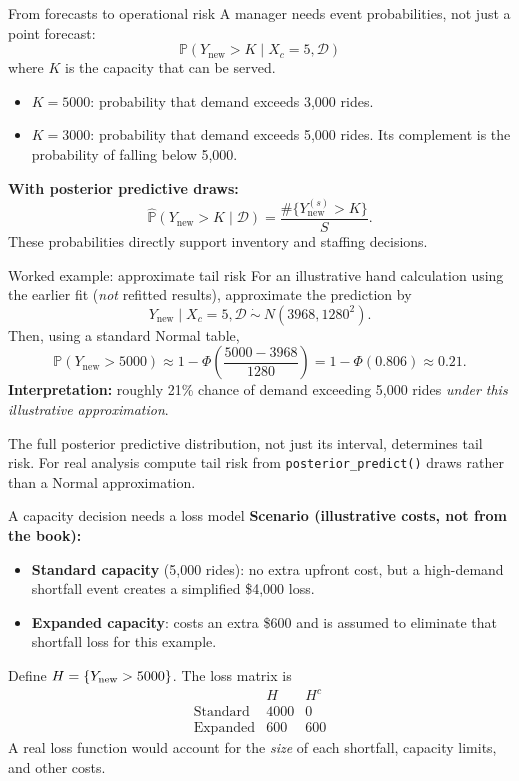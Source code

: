 \documentclass[aspectratio=43,11pt]{beamer}
\newcommand{\Prob}{\mathbb{P}}
\newcommand{\dd}{\mathcal D}
\begin{document}
\begin{frame}{From forecasts to operational risk}
A manager needs event probabilities, not just a point forecast:
\[\Prob(Y_{\mathrm{new}}>K\mid X_c=5,\dd)\]
where $K$ is the capacity that can be served.

\begin{itemize}
\item $K=5000$: probability that demand exceeds 3,000 rides.
\item $K=3000$: probability that demand exceeds 5,000 rides. Its complement is the probability of falling below 5,000.
\end{itemize}
\par\medskip
\textbf{With posterior predictive draws:}
\[\widehat{\Prob}(Y_{\mathrm{new}}>K\mid\dd)=\frac{\#\{Y_{\mathrm{new}}^{(s)}>K\}}{S}.\]
These probabilities directly support inventory and staffing decisions.
\end{frame}

\begin{frame}{Worked example: approximate tail risk}
For an illustrative hand calculation using the earlier fit (\emph{not} refitted results), approximate the prediction by
\[Y_{\mathrm{new}}\mid X_c=5,\dd\ \dot\sim\ N(3968,1280^2).\]
Then, using a standard Normal table,
\[\Prob(Y_{\mathrm{new}}>5000)\approx 1-\Phi\!\left(\frac{5000-3968}{1280}\right)
=1-\Phi(0.806)\approx0.21.\]
\textbf{Interpretation:} roughly 21\% chance of demand exceeding 5,000 rides \emph{under this illustrative approximation}.
\par\medskip
\scriptsize The full posterior predictive distribution, not just its interval, determines tail risk. For real analysis compute tail risk from \texttt{posterior\_predict()} draws rather than a Normal approximation.
\end{frame}

\begin{frame}{A capacity decision needs a loss model}
\textbf{Scenario (illustrative costs, not from the book):}
\begin{itemize}
\item \textbf{Standard capacity} (5,000 rides): no extra upfront cost, but a high-demand shortfall event creates a simplified \$4,000 loss.
\item \textbf{Expanded capacity}: costs an extra \$600 and is assumed to eliminate that shortfall loss for this example.
\end{itemize}
Define $H=\{Y_{\rm new}>5000\}$. The loss matrix is
\[\begin{array}{c|cc}
& H & H^c\\\hline
\text{Standard} &4000&0\\
\text{Expanded}&600&600
\end{array}\]
\scriptsize A real loss function would account for the \emph{size} of each shortfall, capacity limits, and other costs.
\end{frame}
\end{document}
